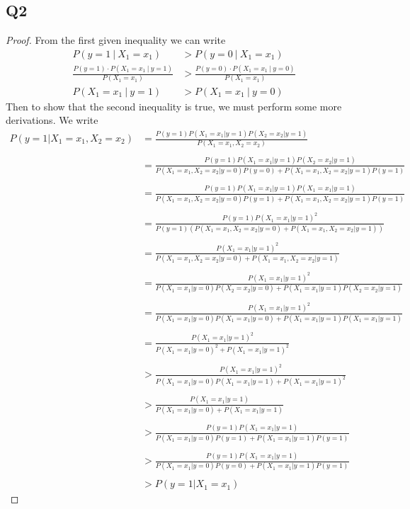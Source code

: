 \documentclass{article}
\theoremstyle{definition}
\begin{document}
    \subsection*{Q2}
    \begin{proof}
    From the first given inequality we can write 
    \begin{align*}
        P(y = 1 \ | \ X_1 = x_1) &> P(y = 0 \ | \ X_1 = x_1) \\
        \frac{P(y=1) \cdot P(X_1 = x_1 \ | \ y = 1)}{P(X_1 = x_1)} &>
        \frac{P(y=0) \cdot P(X_1 = x_1 \ | \ y = 0)}{P(X_1 = x_1)} \\
        P(X_1 = x_1 \ | \ y = 1) &> P(X_1 = x_1 \ | \ y = 0) 
    \end{align*}
    Then to show that the second inequality is true, we must perform some more derivations.
    We write
    \begin{align*}
        P(y=1 | X_1 = x_1, X_2 = x_2) &=
        \frac{P(y=1)P(X_1=x_1 | y=1)P(X_2 = x_2 | y=1)}{P(X_1=x_1,X_2=x_2)} \\\\
        &= \frac{P(y=1)P(X_1=x_1 | y=1)P(X_2 = x_2 | y=1)}{P(X_1=x_1,X_2=x_2 | y=0)P(y=0) + P(X_1=x_1,X_2=x_2|y=1)P(y=1)} \\\\
        &= \frac{P(y=1)P(X_1=x_1 | y=1)P(X_1 = x_1 | y=1)}{P(X_1=x_1,X_2=x_2 | y=0)P(y=1) + P(X_1=x_1,X_2=x_2|y=1)P(y=1)} \\\\
        &= \frac{P(y=1)P(X_1=x_1 | y=1)^2}{P(y=1)\left(P(X_1=x_1,X_2=x_2 | y=0) + P(X_1=x_1,X_2=x_2|y=1)\right)} \\\\
        &= \frac{P(X_1=x_1 | y=1)^2}{P(X_1=x_1,X_2=x_2 | y=0) + P(X_1=x_1,X_2=x_2|y=1)} \\\\
        &= \frac{P(X_1=x_1 | y=1)^2}{P(X_1=x_1 | y=0)P(X_2=x_2|y=0) + P(X_1=x_1|y=1)P(X_2=x_2|y=1)} \\\\
        &= \frac{P(X_1=x_1 | y=1)^2}{P(X_1=x_1 | y=0)P(X_1=x_1|y=0) + P(X_1=x_1|y=1)P(X_1=x_1|y=1)} \\\\
        &= \frac{P(X_1=x_1 | y=1)^2}{P(X_1=x_1 | y=0)^2 + P(X_1=x_1|y=1)^2} \\\\
        &> \frac{P(X_1=x_1 | y=1)^2}{P(X_1=x_1 | y=0)P(X_1=x_1|y=1) + P(X_1=x_1|y=1)^2} \\\\
        &> \frac{P(X_1=x_1|y=1)}{P(X_1=x_1|y=0) + P(X_1=x_1|y=1)} \\\\
        &> \frac{P(y=1)P(X_1=x_1|y=1)}{P(X_1=x_1|y=0)P(y=1) + P(X_1=x_1|y=1)P(y=1)} \\\\ 
        &> \frac{P(y=1)P(X_1=x_1|y=1)}{P(X_1=x_1|y=0)P(y=0) + P(X_1=x_1|y=1)P(y=1)} \\\\ 
        &> P(y=1 | X_1=x_1)
    \end{align*}
\end{proof}
\end{document}
